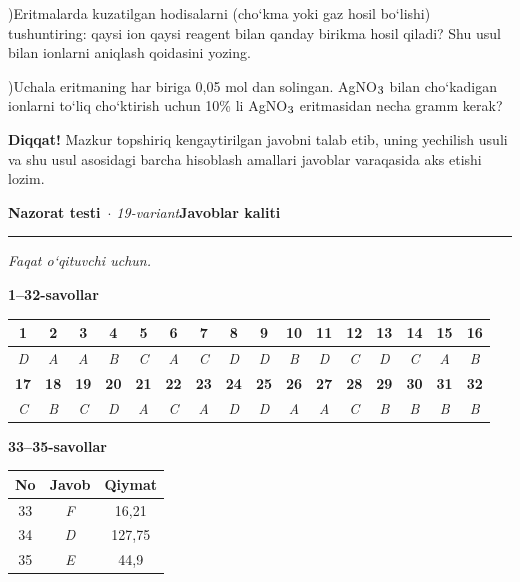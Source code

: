 \documentclass[11pt,a4paper]{article}
\renewcommand{\textsubscript}[1]{\ensuremath{_{\text{\fontsize{8}{8}\selectfont #1}}}}
\newcommand{\qsep}{\par\vspace{1pt}\noindent\rule{0pt}{0.4pt}\par\vspace{5pt}}
\newcommand{\diqqat}[1]{\par\smallskip\noindent\textbf{Diqqat!} #1\par\medskip}
\begin{document}
)Eritmalarda kuzatilgan hodisalarni (cho`kma yoki gaz hosil bo`lishi) tushuntiring: qaysi ion qaysi reagent bilan qanday birikma hosil qiladi? Shu usul bilan ionlarni aniqlash qoidasini yozing.\par
{})Uchala eritmaning har biriga 0,05 mol dan solingan. AgNO\textsubscript{3} bilan cho`kadigan ionlarni to`liq cho`ktirish uchun 10\% li AgNO\textsubscript{3} eritmasidan necha gramm kerak?\par
\diqqat{Mazkur topshiriq kengaytirilgan javobni talab etib, uning yechilish usuli va shu usul asosidagi barcha hisoblash amallari javoblar varaqasida aks etishi lozim.}\qsep
\newpage
\noindent\textbf{\fontsize{13}{15}\selectfont Nazorat testi}\ \textit{$\cdot$ 19-variant}\hfill \textbf{Javoblar kaliti}\par\smallskip\hrule\smallskip
\textit{Faqat o`qituvchi uchun.}\par\medskip
\noindent\textbf{1--32-savollar}\par\smallskip
\noindent\begin{tabular}{|c|c|c|c|c|c|c|c|c|c|c|c|c|c|c|c|}\hline
\textbf{1} & \textbf{2} & \textbf{3} & \textbf{4} & \textbf{5} & \textbf{6} & \textbf{7} & \textbf{8} & \textbf{9} & \textbf{10} & \textbf{11} & \textbf{12} & \textbf{13} & \textbf{14} & \textbf{15} & \textbf{16}\\\hline
\textsl{D} & \textsl{A} & \textsl{A} & \textsl{B} & \textsl{C} & \textsl{A} & \textsl{C} & \textsl{D} & \textsl{D} & \textsl{B} & \textsl{D} & \textsl{C} & \textsl{D} & \textsl{C} & \textsl{A} & \textsl{B}\\\hline
\textbf{17} & \textbf{18} & \textbf{19} & \textbf{20} & \textbf{21} & \textbf{22} & \textbf{23} & \textbf{24} & \textbf{25} & \textbf{26} & \textbf{27} & \textbf{28} & \textbf{29} & \textbf{30} & \textbf{31} & \textbf{32}\\\hline
\textsl{C} & \textsl{B} & \textsl{C} & \textsl{D} & \textsl{A} & \textsl{C} & \textsl{A} & \textsl{D} & \textsl{D} & \textsl{A} & \textsl{A} & \textsl{C} & \textsl{B} & \textsl{B} & \textsl{B} & \textsl{B}\\\hline
\end{tabular}\par\medskip
\noindent\textbf{33--35-savollar}\par\smallskip
\noindent\begin{tabular}{|c|c|c|}\hline \textbf{No} & \textbf{Javob} & \textbf{Qiymat}\\\hline
33 & \textsl{F} & 16,21\\\hline
34 & \textsl{D} & 127,75\\\hline
35 & \textsl{E} & 44,9\\\hline
\end{tabular}\par\medskip
\end{document}
